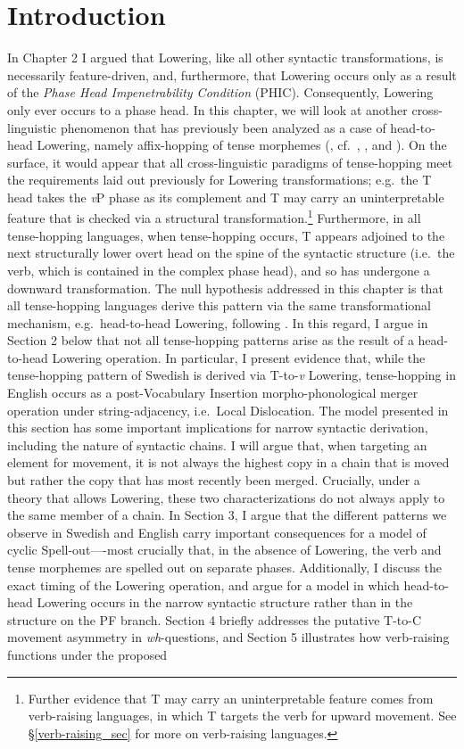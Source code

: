 \section{Introduction}
In Chapter 2 I argued that Lowering, like all other syntactic transformations, is necessarily feature-driven, and, furthermore, that Lowering occurs only as a result of the \textit{Phase Head Impenetrability Condition} (PHIC). Consequently, Lowering only ever occurs to a phase head. In this chapter, we will look at another cross-linguistic phenomenon that has previously been analyzed as a case of head-to-head Lowering, namely affix-hopping of tense morphemes (, cf.\ , , and ). On the surface, it would appear that all cross-linguistic paradigms of tense-hopping meet the requirements laid out previously for Lowering transformations; e.g.\ the T head takes the \textit{v}P phase as its complement and T may carry an uninterpretable feature that is checked via a structural transformation.\footnote{\label{fn_aa}Further evidence that T may carry an uninterpretable feature comes from verb-raising languages, in which T targets the verb for upward movement. See \S\ref{verb-raising_sec} for more on verb-raising languages.} Furthermore, in all tense-hopping languages, when tense-hopping occurs, T appears adjoined to the next structurally lower overt head on the spine of the syntactic structure (i.e.\ the verb, which is contained in the complex phase head), and so has undergone a downward transformation. The null hypothesis addressed in this chapter is that all tense-hopping languages derive this pattern via the same transformational mechanism, e.g.\ head-to-head Lowering, following \citeauthor{embick_noyer2001}. In this regard, I argue in Section 2 below that not all tense-hopping patterns arise as the result of a head-to-head Lowering operation. In particular, I present evidence that, while the tense-hopping pattern of Swedish is derived via T-to-\textit{v} Lowering, tense-hopping in English occurs as a post-Vocabulary Insertion morpho-phonological merger operation under string-adjacency, i.e.\ Local Dislocation. The model presented in this section has some important implications for narrow syntactic derivation, including the nature of syntactic chains. I will argue that, when targeting an element for movement, it is not always the highest copy in a chain that is moved but rather the copy that has most recently been merged. Crucially, under a theory that allows Lowering, these two characterizations do not always apply to the same member of a chain. In Section 3, I  argue that the different patterns we observe in Swedish and English carry important consequences for a model of cyclic Spell-out----most crucially that, in the absence of Lowering, the verb and tense morphemes are spelled out on separate phases. Additionally, I discuss the exact timing of the Lowering operation, and argue for a model in which head-to-head Lowering occurs in the narrow syntactic structure rather than in the structure on the PF branch. Section 4 briefly addresses the putative T-to-C movement asymmetry in {\it wh}-questions, and Section 5 illustrates how verb-raising functions under the proposed 